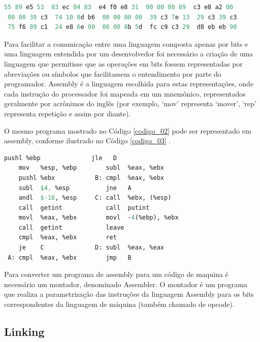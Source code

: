 \begin{lstlisting}[language=Pascal, caption={Algoritmo de 
									   Euclides Estendido, com adaptações},
                                                            label=codigo_02]
 55 89 e5 53  83 ec 04 83  e4 f0 e8 31  00 00 00 89  c3 e8 a2 00
 00 00 39 c3  74 10 8d b6  00 00 00 00  39 c3 7e 13  29 c3 39 c3
 75 f6 89 c1  24 e8 6e 00  00 00 8b 5d  fc c9 c3 29  d8 eb eb 90
\end{lstlisting}

Para facilitar a comunicação entre uma linguagem composta apenas por bits e 
uma linguagem entendida por um desenvolvedor foi necessário a criação de uma
 linguagem que permitisse que as operações em bits fossem representadas por 
abreviações ou símbolos que facilitassem o entendimento por parte do programador.
 Assembly é a linguagem escolhida para estas representações, onde cada 
instrução do processador foi mapeada em um mnemônico, representados geralmente 
por acrônimos do inglês (por exemplo, ‘mov’ representa ‘mover’, ‘rep’ 
representa repetição e assim por diante)\cite{ref34}.

O mesmo programa mostrado no Código \ref{codigo_02} pode ser representado 
em assembly, conforme ilustrado no Código \ref{codigo_03} \cite{ref34}. 

\begin{lstlisting}[language=Pascal,frame=single,captionpos=b,caption={Algoritmo de 
                Euclides estendido representado em Assembly, com adaptações},
                                                            label=codigo_03]
    pushl %ebp              jle   D
    mov   %esp, %ebp        subl  %eax, %ebx
    pushl %ebx           B: cmpl  %eax, %ebx   
    subl  $4, %esp          jne   A
    andl  $-16, %esp     C: call  %ebx, (%esp)
    call  getint            call  putint
    movl  %eax, %ebx        movl  -4(%ebp), %ebx
    call  getint            leave
    cmpl  %eax, %ebx        ret
    je    C              D: subl  %eax, %eax
 A: cmpl  %eax, %ebx        jmp   B

\end{lstlisting}

Para converter um programa de assembly para um código de maquina é necessário
 um montador, denominado Assembler. O montador é um programa que realiza a 
parametrização das instruções da linguagem Assembly para os bits 
correspondentes da linguagem de máquina (também chamado de opcode)\cite{ref35}.

\subsection{Linking}


